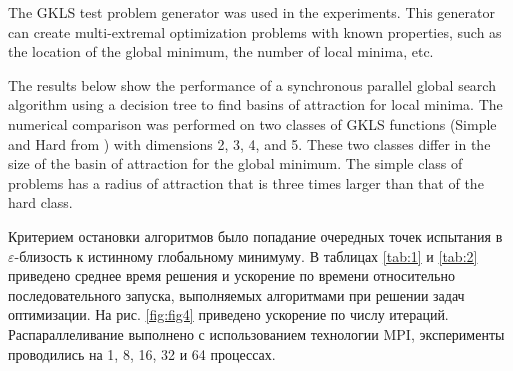 \documentclass[runningheads]{llncs}
\begin{document}
The GKLS test problem generator was used in the experiments. This generator can create multi-extremal optimization problems with known properties, such as the location of the global minimum, the number of local minima, etc.


The results below show the performance of a synchronous parallel global search algorithm using a decision tree to find basins of attraction for local minima. The numerical comparison was performed on two classes of GKLS functions (Simple and Hard from \cite{Sergeyev2006}) with dimensions 2, 3, 4, and 5. These two classes differ in the size of the basin of attraction for the global minimum. The simple class of problems has a radius of attraction that is three times larger than that of the hard class.



Критерием остановки алгоритмов было попадание очередных точек испытания в $\varepsilon$-близость к истинному глобальному минимуму. В таблицах \ref{tab:1} и \ref{tab:2} приведено среднее время решения и ускорение по времени относительно последовательного запуска, выполняемых алгоритмами при решении задач оптимизации. На рис. \ref{fig:fig4} приведено ускорение по числу итераций. Распараллеливание выполнено с использованием технологии MPI, эксперименты проводились на 1, 8, 16, 32 и 64 процессах.
\end{document}
